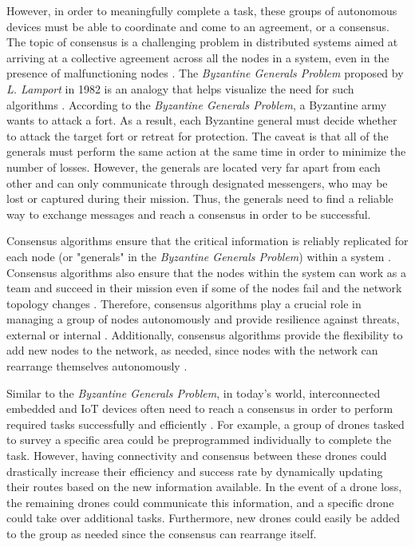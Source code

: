 \documentclass[compsoc]{IEEEtran}
\begin{document}

However, in order to meaningfully complete a task, these groups of autonomous devices must be able to coordinate and come to an agreement, or a consensus. The topic of consensus is a challenging problem in distributed systems aimed at arriving at a collective agreement across all the nodes in a system, even in the presence of malfunctioning nodes \cite{Bach_Mihaljevic_Zagar_2018}. The \textit{Byzantine Generals Problem} proposed by \textit{L. Lamport} in 1982 is an analogy that helps visualize the need for such algorithms \cite{Lamport_1983}. According to the \textit{Byzantine Generals Problem}, a Byzantine army wants to attack a fort. As a result, each Byzantine general must decide whether to attack the target fort or retreat for protection. The caveat is that all of the generals must perform the same action at the same time in order to minimize the number of losses. However, the generals are located very far apart from each other and can only communicate through designated messengers, who may be lost or captured during their mission. Thus, the generals need to find a reliable way to exchange messages and reach a consensus in order to be successful. 

Consensus algorithms ensure that the critical information is reliably replicated for each node (or "generals" in the \textit{Byzantine Generals Problem}) within a system \cite{tsitsiklis1984problems}. Consensus algorithms also ensure that the nodes within the system can work as a team and succeed in their mission even if some of the nodes fail and the network topology changes \cite{raft_paper}. Therefore, consensus algorithms play a crucial role in managing a group of nodes autonomously and provide resilience against threats, external or internal \cite{Kar_Moura_2010}. Additionally, consensus algorithms provide the flexibility to add new nodes to the network, as needed, since nodes with the network can rearrange themselves autonomously \cite{Olfati_Saber_Fax_Murray_2007}. 

Similar to the \textit{Byzantine Generals Problem}, in today's world, interconnected embedded and IoT devices often need to reach a consensus in order to perform required tasks successfully and efficiently \cite{Orostica_Nunez_2019}. For example, a group of drones tasked to survey a specific area could be preprogrammed individually to complete the task. However, having connectivity and consensus between these drones could drastically increase their efficiency and success rate by dynamically updating their routes based on the new information available. In the event of a drone loss, the remaining drones could communicate this information, and a specific drone could take over additional tasks. Furthermore, new drones could easily be added to the group as needed since the consensus can rearrange itself. 
\end{document}

